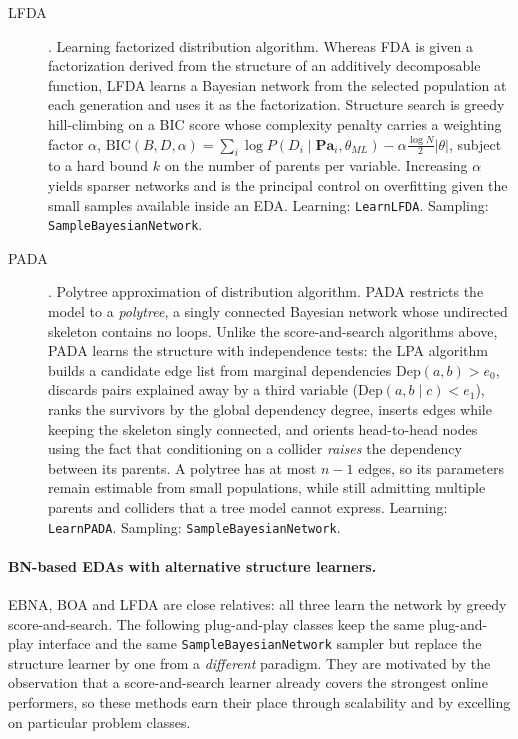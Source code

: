 \documentclass[a4paper,11pt]{article}
\begin{document}
\begin{description}
  \item[LFDA] \citep{Muhlenbein_and_Mahnig:1999}.
    Learning factorized distribution algorithm.  Whereas FDA is given a
    factorization derived from the structure of an additively decomposable
    function, LFDA learns a Bayesian network from the selected population at each
    generation and uses it as the factorization.  Structure search is greedy
    hill-climbing on a BIC score whose complexity penalty carries a weighting
    factor $\alpha$,
    $\mathrm{BIC}(B,D,\alpha) = \sum_i \log P(D_i \mid \mathbf{Pa}_i, \theta_{ML})
    - \alpha \frac{\log N}{2} |\theta|$,
    subject to a hard bound $k$ on the number of parents per variable.  Increasing
    $\alpha$ yields sparser networks and is the principal control on overfitting
    given the small samples available inside an EDA.
    Learning: \texttt{LearnLFDA}. Sampling: \texttt{SampleBayesianNetwork}.

  \item[PADA] \citep{Soto_et_al:1999,Ochoa_et_al:2000}.
    Polytree approximation of distribution algorithm.  PADA restricts the model to
    a \emph{polytree}, a singly connected Bayesian network whose undirected
    skeleton contains no loops.  Unlike the score-and-search algorithms above,
    PADA learns the structure with independence tests: the LPA algorithm builds a
    candidate edge list from marginal dependencies $\mathrm{Dep}(a,b) > e_0$,
    discards pairs explained away by a third variable
    ($\mathrm{Dep}(a,b \mid c) < e_1$), ranks the survivors by the global
    dependency degree, inserts edges while keeping the skeleton singly connected,
    and orients head-to-head nodes using the fact that conditioning on a collider
    \emph{raises} the dependency between its parents.  A polytree has at most $n-1$
    edges, so its parameters remain estimable from small populations, while still
    admitting multiple parents and colliders that a tree model cannot express.
    Learning: \texttt{LearnPADA}. Sampling: \texttt{SampleBayesianNetwork}.
\end{description}

\paragraph{BN-based EDAs with alternative structure learners.}
EBNA, BOA and LFDA are close relatives: all three learn the network by greedy
score-and-search.  The following plug-and-play classes keep the same
plug-and-play interface and the same \texttt{SampleBayesianNetwork} sampler but
replace the structure learner by one from a \emph{different} paradigm.  They are
motivated by the observation that a score-and-search learner already covers the
strongest online performers, so these methods earn their place through
scalability and by excelling on particular problem classes.
\end{document}
